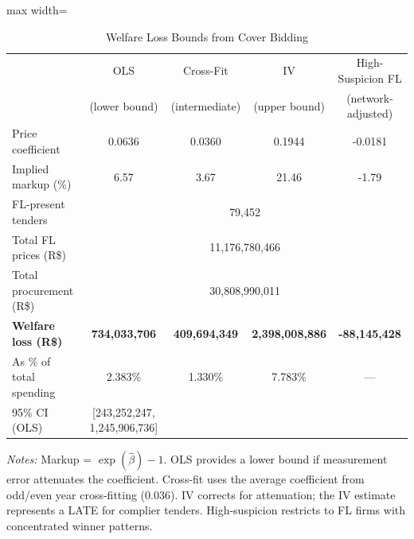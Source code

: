 \begin{table}[htbp]
\centering
\caption{Welfare Loss Bounds from Cover Bidding}
\label{tab:welfare_bounds}
\begin{adjustbox}{max width=\textwidth}
\begin{threeparttable}
\small
\begin{tabular}{lcccc}
\toprule
 & OLS & Cross-Fit & IV & High-Suspicion FL \\
 & (lower bound) & (intermediate) & (upper bound) & (network-adjusted) \\
\midrule
Price coefficient & 0.0636 & 0.0360 & 0.1944 & -0.0181 \\
Implied markup (\%) & 6.57 & 3.67 & 21.46 & -1.79 \\
\midrule
FL-present tenders & \multicolumn{4}{c}{79,452} \\
Total FL prices (R\$) & \multicolumn{4}{c}{11,176,780,466} \\
Total procurement (R\$) & \multicolumn{4}{c}{30,808,990,011} \\
\midrule
\textbf{Welfare loss (R\$)} & \textbf{734,033,706} & \textbf{409,694,349} & \textbf{2,398,008,886} & \textbf{-88,145,428} \\
As \% of total spending & 2.383\% & 1.330\% & 7.783\% & --- \\
95\% CI (OLS) & [243,252,247, 1,245,906,736] & & & \\
\bottomrule
\end{tabular}
\begin{tablenotes}
\small
\item \textit{Notes:} Markup = $\exp(\hat{\beta}) - 1$.
OLS provides a lower bound if measurement error attenuates the coefficient.
Cross-fit uses the average coefficient from odd/even year cross-fitting (0.036).
IV corrects for attenuation; the IV estimate represents a LATE for complier tenders.
High-suspicion restricts to FL firms with concentrated winner patterns.
\end{tablenotes}
\end{threeparttable}
\end{adjustbox}
\end{table}

